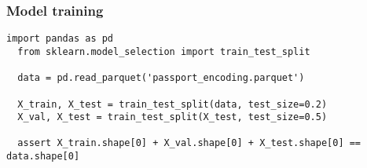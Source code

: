 \subsubsection{Model training}

\begin{lstlisting}[caption={Dataset splitting}]
  import pandas as pd
  from sklearn.model_selection import train_test_split

  data = pd.read_parquet('passport_encoding.parquet')

  X_train, X_test = train_test_split(data, test_size=0.2)
  X_val, X_test = train_test_split(X_test, test_size=0.5)

  assert X_train.shape[0] + X_val.shape[0] + X_test.shape[0] == data.shape[0]
\end{lstlisting}

